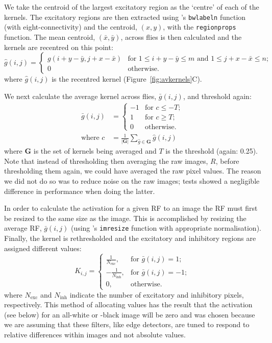 We take the centroid of the largest excitatory region as the `centre' of each of the kernels.
The excitatory regions are then extracted using \Matlab's \texttt{bwlabeln} function (with eight-connectivity) and the centroid, $(x,y)$, with the \texttt{regionprops} function.
The mean centroid, $(\bar{x},\bar{y})$, across flies is then calculated and the kernels are recentred on this point:
$$
\hat{g}(i,j) = \left\{ \begin{array}{ll} g(i+y-\bar{y},j+x-\bar{x}) & \mbox{for } 1\le i+y-\bar{y}\le m \mbox{ and } 1\le j+x-\bar{x}\le n;\\
0 & \mbox{otherwise.} \end{array} \right.
$$
where $\hat{g}(i,j)$ is the recentred kernel (Figure~\ref{fig:avkernels}C).

We next calculate the average kernel across flies, $\bar{g}(i,j)$, and threshold again:
\begin{align*}
\bar{g}(i,j) &= \left\{ \begin{array}{rl}
-1 & \mbox{for } c \le -T; \\
1 & \mbox{for } c \ge T; \\
0 & \mbox{otherwise.} 
\end{array} \right. \\
\mbox{where } c &= \frac{1}{|\mathbf{G}|}\sum\limits_{\hat{g} \in \mathbf{G}} \hat{g}(i,j)
\end{align*}
where $\mathbf{G}$ is the set of kernels being averaged and $T$ is the threshold (again: 0.25). Note that instead of thresholding then averaging the raw images, $R$, before thresholding them again, we could have averaged the raw pixel values. The reason we did not do so was to reduce noise on the raw images; tests showed a negligible difference in performance when doing the latter.

In order to calculate the activation for a given \ac{RF} to an image the \ac{RF} must first be resized to the same size as the image.
This is accomplished by resizing the average \ac{RF}, $\bar{g}(i,j)$ (using \Matlab's \texttt{imresize} function with appropriate normalisation).
Finally, the kernel is rethresholded and the excitatory and inhibitory regions are assigned different values:
$$
K_{i,j} = \left\{
\begin{array}{rl}
\frac{1}{N_\mathrm{exc}}, & \mbox{for } \bar{g}(i,j) = 1; \\
-\frac{1}{N_\mathrm{inh}}, & \mbox{for } \bar{g}(i,j) = -1; \\
0, & \mbox{otherwise.}
\end{array}
\right.
$$
where $N_\mathrm{exc}$ and $N_\mathrm{inh}$ indicate the number of excitatory and inhibitory pixels, respectively.
This method of allocating values has the result that the activation (see below) for an all-white or -black image will be zero and was chosen because we are assuming that these filters, like edge detectors, are tuned to respond to relative differences within images and not absolute values.

